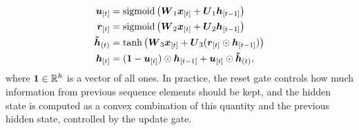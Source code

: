 \begin{align*}
    \Elem{u}{t} &= \sigmoid\Par{\Matrix{W}_{1}\Elem{x}{t} + \Matrix{U}_{1}\Elem{h}{t-1}}\\
    \Elem{r}{t} &= \sigmoid\Par{\Matrix{W}_{2}\Elem{x}{t} + \Matrix{U}_{2}\Elem{h}{t-1}}\\
    \Vector{\tilde{h}}_{(t)} &= \tanh\Par{\Matrix{W}_{3}\Elem{x}{t} + \Matrix{U}_{3}(\Elem{r}{t} \odot \Elem{h}{t-1})}\\
    \Elem{h}{t} &= (\Ones - \Elem{u}{t}) \odot \Elem{h}{t-1} + \Elem{u}{t} \odot \Vector{\tilde{h}}_{(t)},
\end{align*}
where $\boldsymbol{1} \in \mathbb{R}^h$ is a vector of all ones. In practice, the reset gate controls how much information from previous sequence elements should be kept, and the hidden state is computed as a convex combination of this quantity and the previous hidden state, controlled by the update gate.

